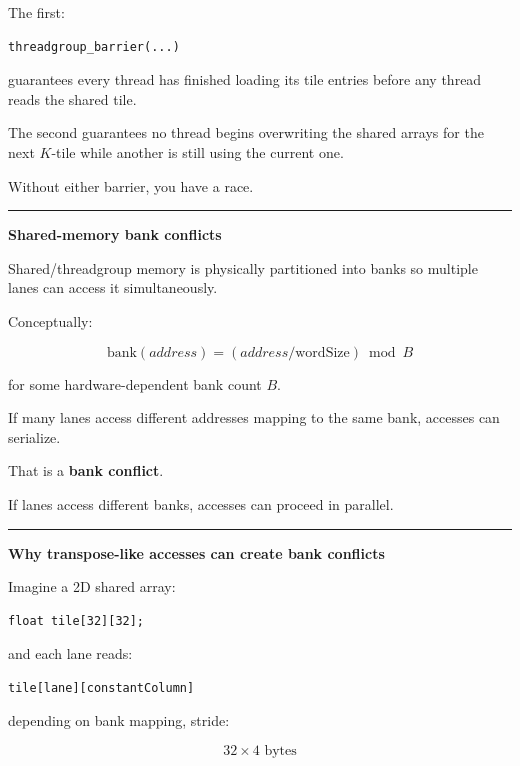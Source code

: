 The first:

\protect{}\label{lzwp5h}%
\begin{verbatim}
threadgroup_barrier(...)
\end{verbatim}

guarantees every thread has finished loading its tile entries before any thread reads the shared tile.

The second guarantees no thread begins overwriting the shared arrays for the next \(K\)-tile while another is still using the current one.

Without either barrier, you have a race.

\begin{center}\rule{0.5\linewidth}{0.5pt}\end{center}

\textbf{Shared-memory bank conflicts}

Shared/threadgroup memory is physically partitioned into banks so multiple lanes can access it simultaneously.

Conceptually:

\[
\text{bank}(address)
=
(address/\text{wordSize})\bmod B
\]

for some hardware-dependent bank count \(B\).

If many lanes access different addresses mapping to the same bank, accesses can serialize.

That is a \textbf{bank conflict}.

If lanes access different banks, accesses can proceed in parallel.

\begin{center}\rule{0.5\linewidth}{0.5pt}\end{center}

\textbf{Why transpose-like accesses can create bank conflicts}

Imagine a 2D shared array:

\protect{}\label{32aupj}%
\begin{verbatim}
float tile[32][32];
\end{verbatim}

and each lane reads:

\protect{}\label{dov08i}%
\begin{verbatim}
tile[lane][constantColumn]
\end{verbatim}

depending on bank mapping, stride:

\[
32\times4\text{ bytes}
\]

